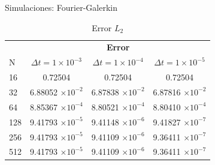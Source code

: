 \label{Tablas-Galerkin}
\begin{frame}{Simulaciones: Fourier-Galerkin \hspace{2cm} \hyperlink{Navegador}{}}
    \begin{table}
        \centering
        \begin{tabular}{lccc}
        	\toprule
        	\multicolumn{1}{c}{} &\multicolumn{3}{c}{\textbf{Error}} \\
        	N &$\Delta t=1\times 10^{-3}$ &$\Delta t=1\times 10^{-4}$ &$\Delta t=1\times 10^{-5}$ \\
        	\midrule
        	16&0.72504 &0.72504 &0.72504 \\
        	\midrule
        	32& 6.88052 $\times 10 ^{-2}$& 6.87838 $\times 10 ^{-2}$& 6.87816 $\times 10 ^{-2}$ \\
        	\midrule
        	64& 8.85367 $\times 10 ^{-4}$& 8.80521 $\times 10 ^{-4}$& 8.80410 $\times 10 ^{-4}$ \\
        	\midrule
        	128& 9.41793 $\times 10 ^{-5}$& 9.41148 $\times 10 ^{-6}$& 9.41827 $\times 10 ^{-7}$ \\
        	\midrule
        	256& 9.41793 $\times 10 ^{-5}$& 9.41109 $\times 10 ^{-6}$& 9.36411 $\times 10 ^{-7}$ \\
        	\midrule
        	512& 9.41793 $\times 10 ^{-5}$& 9.41109 $\times 10 ^{-6}$& 9.36411 $\times 10 ^{-7}$ \\
        	\bottomrule
        \end{tabular}
        \caption{Error $L_2$}
    \end{table}
\end{frame}

